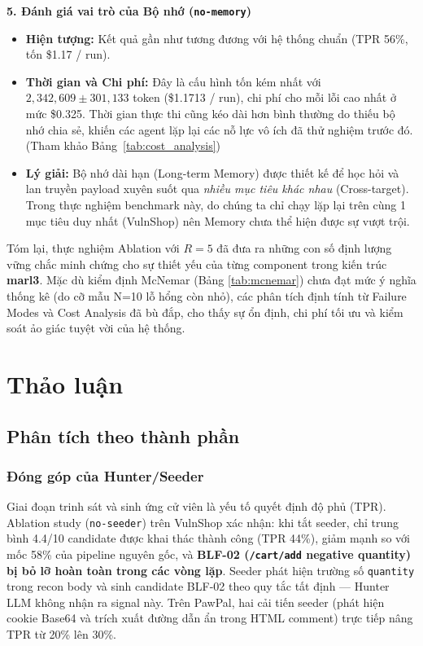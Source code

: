 \textbf{5. Đánh giá vai trò của Bộ nhớ (\texttt{no-memory})}
\begin{itemize}
    \item \textbf{Hiện tượng:} Kết quả gần như tương đương với hệ thống chuẩn (TPR 56\%, tốn \$1.17 / run). 
    \item \textbf{Thời gian và Chi phí:} Đây là cấu hình tốn kém nhất với $2,342,609 \pm 301,133$ token (\$1.1713 / run), chi phí cho mỗi lỗi cao nhất ở mức \$0.325. Thời gian thực thi cũng kéo dài hơn bình thường do thiếu bộ nhớ chia sẻ, khiến các agent lặp lại các nỗ lực vô ích đã thử nghiệm trước đó. (Tham khảo Bảng~\ref{tab:cost_analysis})
    \item \textbf{Lý giải:} Bộ nhớ dài hạn (Long-term Memory) được thiết kế để học hỏi và lan truyền payload xuyên suốt qua \textit{nhiều mục tiêu khác nhau} (Cross-target). Trong thực nghiệm benchmark này, do chúng ta chỉ chạy lặp lại trên cùng 1 mục tiêu duy nhất (VulnShop) nên Memory chưa thể hiện được sự vượt trội.
\end{itemize}

Tóm lại, thực nghiệm Ablation với $R=5$ đã đưa ra những con số định lượng vững chắc minh chứng cho sự thiết yếu của từng component trong kiến trúc \textbf{marl3}. Mặc dù kiểm định McNemar (Bảng \ref{tab:mcnemar}) chưa đạt mức ý nghĩa thống kê (do cỡ mẫu N=10 lỗ hổng còn nhỏ), các phân tích định tính từ Failure Modes và Cost Analysis đã bù đắp, cho thấy sự ổn định, chi phí tối ưu và kiểm soát ảo giác tuyệt vời của hệ thống.
\section{Thảo luận}
\label{sec:discussion}

\subsection{Phân tích theo thành phần}

\subsubsection{Đóng góp của Hunter/Seeder}

Giai đoạn trinh sát và sinh ứng cử viên là yếu tố quyết định độ phủ (TPR). Ablation study (\texttt{no-seeder}) trên VulnShop xác nhận: khi tắt seeder, chỉ trung bình 4.4/10 candidate được khai thác thành công (TPR 44\%), giảm mạnh so với mốc 58\% của pipeline nguyên gốc, và \textbf{BLF-02 (\texttt{/cart/add} negative quantity) bị bỏ lỡ hoàn toàn trong các vòng lặp}. Seeder phát hiện trường số \texttt{quantity} trong recon body và sinh candidate BLF-02 theo quy tắc tất định --- Hunter LLM không nhận ra signal này. Trên PawPal, hai cải tiến seeder (phát hiện cookie Base64 và trích xuất đường dẫn ẩn trong HTML comment) trực tiếp nâng TPR từ 20\% lên 30\%.

